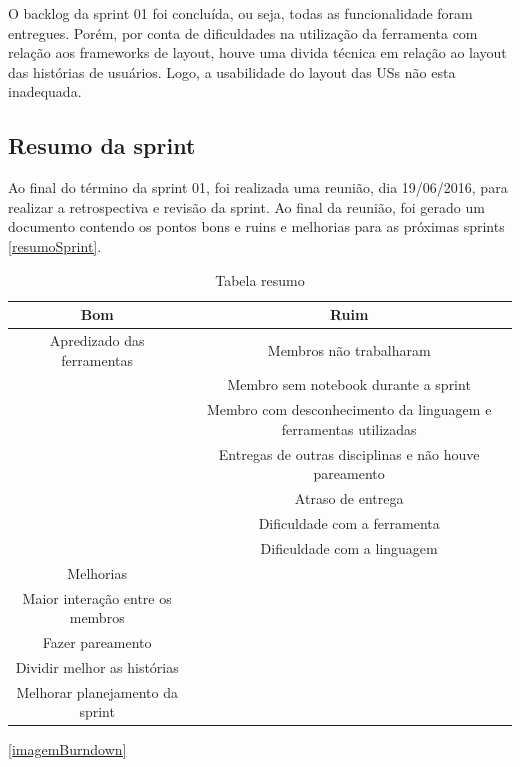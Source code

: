 O backlog da sprint 01 foi concluída, ou seja, todas as funcionalidade foram entregues. Porém, por conta de dificuldades na utilização da ferramenta com relação aos frameworks de layout, houve uma divida técnica em relação ao layout das histórias de usuários. Logo, a usabilidade do layout das USs não esta inadequada.

\subsection{Resumo da sprint}

Ao final do término da sprint 01, foi realizada uma reunião, dia 19/06/2016, para realizar a retrospectiva e revisão da sprint. Ao final da reunião, foi gerado um documento contendo os pontos bons e ruins e melhorias para as próximas sprints \ref{resumoSprint}.


\begin{table}[H]
    \centering
    \caption{Tabela resumo}
    \label{tabelaResumoSprint}
    \begin{tabular}{|c|c|}
        \hline
        Bom & Ruim \\
        \hline
        Apredizado das ferramentas  &  Membros não trabalharam \\
        & Membro sem notebook durante a sprint \\
        & Membro com desconhecimento da linguagem e ferramentas utilizadas\\
        &  Entregas de outras disciplinas e não houve pareamento \\
        &  Atraso de entrega\\
        &  Dificuldade com a ferramenta\\
        & Dificuldade com a linguagem\\
        \hline
        Melhorias & \\
        \hline
        Maior interação entre os membros \\
        Fazer pareamento \\
        Dividir melhor as histórias \\
        Melhorar planejamento da sprint \\
        \hline
    \end{tabular}
\end{table}


\ref{imagemBurndown}
